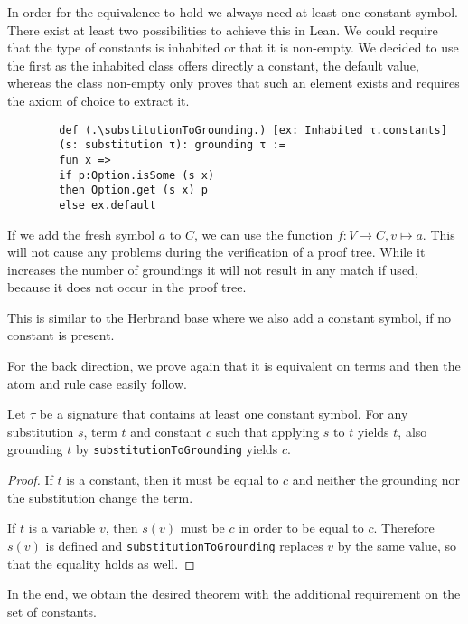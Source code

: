     In order for the equivalence to hold we always need at least one constant symbol. There exist at least two possibilities to achieve this in Lean. We could require that the type of constants is inhabited or that it is non-empty. We decided to use the first as the inhabited class offers directly a constant, the default value, whereas the class non-empty only proves that such an element exists and requires the axiom of choice to extract it.

    \begin{lstlisting}
        def (.\substitutionToGrounding.) [ex: Inhabited τ.constants] 
        (s: substitution τ): grounding τ :=
        fun x => 
        if p:Option.isSome (s x) 
        then Option.get (s x) p 
        else ex.default
    \end{lstlisting}

    \begin{contexample}
        If we add the fresh symbol $a$ to $C$, we can use the function $f: V \to C, v \mapsto a$. This will not cause any problems during the verification of a proof tree. While it increases the number of groundings it will not result in any match if used, because it does not occur in the proof tree.
    \end{contexample}

    This is similar to the Herbrand base where we also add a constant symbol, if no constant is present.

    For the back direction, we prove again that it is equivalent on terms and then the atom and rule case easily follow.

    \begin{lemma}[\substitutionToGroundingEquivTerm]
        Let $\tau$ be a signature that contains at least one constant symbol. For any substitution $s$, term $t$ and constant $c$ such that applying $s$ to $t$ yields $t$, also grounding $t$ by \lstinline|substitutionToGrounding| yields $c$.
    \end{lemma}
    \begin{proof}
        If $t$ is a constant, then it must be equal to $c$ and neither the grounding nor the substitution change the term.

        If $t$ is a variable $v$, then $s(v)$ must be $c$ in order to be equal to $c$. Therefore $s(v)$ is defined and \lstinline|substitutionToGrounding| replaces $v$ by the same value, so that the equality holds as well.
    \end{proof}

    In the end, we obtain the desired theorem with the additional requirement on the set of constants.

